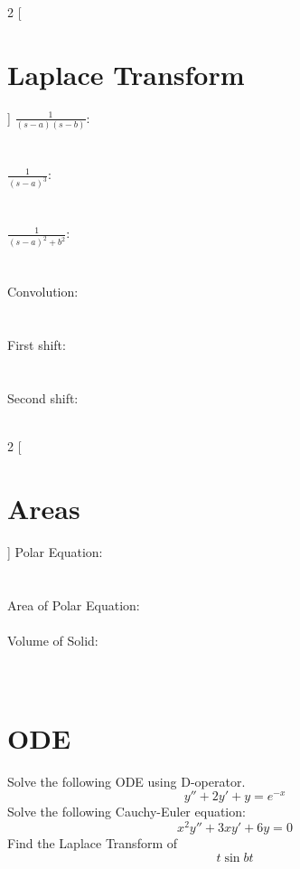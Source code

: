 \documentclass{exam}
\begin{document}
\begin{multicols}{2}
[
\section{Laplace Transform}
]
$\frac{1}{(s-a)(s-b)}$: \\\\\\
$\frac{1}{(s-a)^3}$: \\\\\\
$\frac{1}{(s-a)^2+b^2}$: \\\\\\
Convolution: \\\\\\
First shift: \\\\\\
Second shift: \\\\
\end{multicols}
\begin{multicols}{2}
[
\section{Areas}
]
Polar Equation: \\\\\\
Area of Polar Equation: \\\\
Volume of Solid: \\\\\\
\end{multicols}
\newpage
\section{ODE}
\begin{questions}
\question Solve the following ODE using D-operator. 
\begin{equation*}
	y''+2y'+y=e^{-x}
\end{equation*}
\question Solve the following Cauchy-Euler equation:
\begin{equation*}
	x^2y''+3xy'+6y=0
\end{equation*}
\question Find the Laplace Transform of
\begin{equation*}
	t\sin bt
\end{equation*}
\end{questions}
\end{document}
